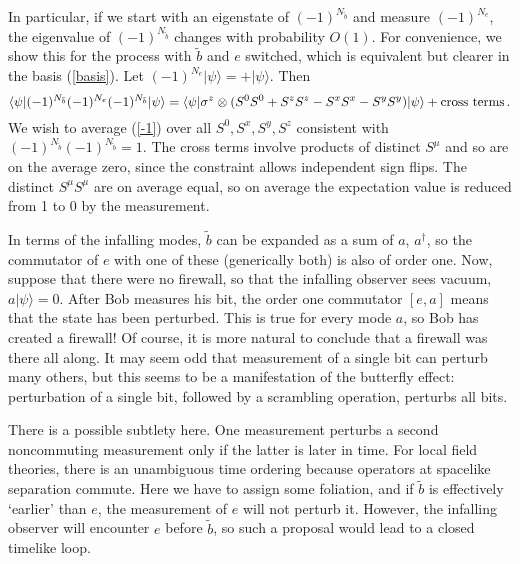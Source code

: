 \documentclass[12pt]{article}
\newcommand{\be}{\begin{equation}}
\newcommand{\ee}{\end{equation}}
\begin{document}
In particular, if we start with an eigenstate of $(-1)^{N_{\tilde b}}$ and measure $(-1)^{N_{e}}$, the eigenvalue of $(-1)^{N_{\tilde b}}$ changes with probability $O(1)$.  For convenience, we show this for the process with $\tilde b$ and $e$ switched, which is equivalent but clearer in the basis (\ref{basis}).  Let $(-1)^{N_e} |\psi\rangle = +  |\psi\rangle$.  Then
\be
\label{-1}
\langle \psi | (-1)^{N_{\tilde b}} (-1)^{N_e} (-1)^{N_{\tilde b}} |\psi\rangle
= \langle \psi |  \sigma^z \otimes( S^0 S^0 + S^z S^z - S^x S^x - S^y S^y )  |\psi\rangle + {\rm cross\ terms} \,.
\ee
We wish to average (\ref{-1}) over all $S^0,S^x,S^y,S^z$ consistent with $(-1)^{N_{\tilde b}} (-1)^{N_{\tilde b}} = 1$.
The cross terms involve products of distinct $S^\mu$ and so are on the average zero, since the constraint allows independent sign flips.  The distinct $S^\mu S^\mu$ are on average equal, so on average the expectation value is reduced from 1 to 0 by the measurement.


In terms of the infalling modes, $\tilde b$ can be expanded as a sum of $a$, $a^\dagger$, so the commutator of $e$ with one of these (generically both) is also of order one.
Now, suppose that there were no firewall, so that the infalling observer sees vacuum, $a |\psi \rangle = 0$.  After Bob measures his bit, the order one commutator $[e,a]$ means that the state has been perturbed.  This is true for every mode $a$, so Bob has created a firewall!  Of course, it is more natural to conclude that a firewall was there all along.  It may seem odd that measurement of a single bit can perturb many others, but this seems to be a manifestation of the butterfly effect: perturbation of a single bit, followed by a scrambling operation, perturbs all bits.

There is a possible subtlety here.  One measurement perturbs a second noncommuting measurement only if the latter is later in time.  For local field theories, there is an unambiguous time ordering because operators at spacelike separation commute.  Here we have to assign some foliation, and if $\tilde b$ is effectively `earlier' than $e$, the measurement of $e$ will not perturb it.  However, the infalling observer will encounter $e$ before $\tilde b$, so such a proposal would lead to a closed timelike loop.
\end{document}
